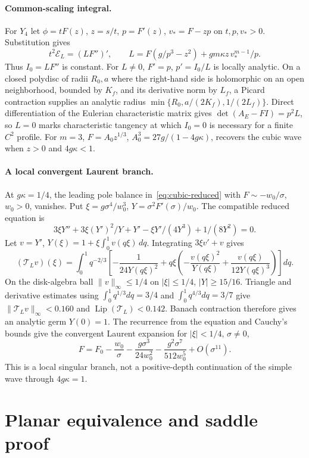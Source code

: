 \documentclass[12pt,a4paper,oneside]{report}
\numberwithin{equation}{chapter}
\theoremstyle{definition}
\theoremstyle{remark}\newtheorem{remark}[theorem]{Remark}
\newif\ifreviewmarks
\DeclareRobustCommand{\review}[1]{{\ifreviewmarks\color{authorblue}\fi #1}}
\begin{document}
\paragraph{Common-scaling integral.}
For $Y_4$ let $\phi=tF(z)$, $z=s/t$, $p=F'(z)$, $v_*=F-zp$ on $t,p,v_*>0$. Substitution gives
\[
 t^2\mathcal E_L=(LF'')',\qquad
 L=F(g/p^3-z^2)+gm\kappa z\,v_*^{m-1}/p .
\]
Thus $I_0=LF''$ is constant. For $L\ne0$, $F'=p$, $p'=I_0/L$ is locally analytic. On a closed polydisc of radii $R_0,a$ where the right-hand side is holomorphic on an open neighborhood, bounded by $K_f$, and its derivative norm by $L_f$, a Picard contraction supplies an analytic radius $\min\{R_0,a/(2K_f),1/(2L_f)\}$. Direct differentiation of the Eulerian characteristic matrix gives $\det(A_E-FI)=p^2L$, so $L=0$ marks characteristic tangency at which $I_0=0$ is necessary for a finite $C^2$ profile. For $m=3$, $F=A_0z^{1/3}$, $A_0^3=27g/(1-4g\kappa)$, recovers the cubic wave when $z>0$ and $4g\kappa<1$.

\paragraph{A local convergent Laurent branch.}
At $g\kappa=1/4$, the leading pole balance in~\eqref{eq:cubic-reduced} with $F\sim-w_0/\sigma$, $w_0>0$, vanishes. Put $\xi=g\sigma^4/w_0^3$, $Y=\sigma^2F'(\sigma)/w_0$. The compatible reduced equation is
\[
 3\xi Y''+3\xi (Y')^2/Y+Y'-\xi Y'/(4Y^3)+1/(8Y^2)=0 .
\]
Let $v=Y'$, $Y(\xi)=1+\xi\int_0^1v(q\xi)\,dq$. Integrating $3\xi v'+v$ gives
\[
 (\mathcal T_L v)(\xi)=\int_0^1q^{-2/3}
 \left[-\frac1{24Y(q\xi)^2}
   +q\xi\left(-\frac{v(q\xi)^2}{Y(q\xi)}
             +\frac{v(q\xi)}{12Y(q\xi)^3}\right)\right]dq .
\]
On the disk-algebra ball $\|v\|_\infty\le1/4$ on $|\xi|\le1/4$, $|Y|\ge15/16$. Triangle and derivative estimates using $\int_0^1q^{1/3}dq=3/4$ and $\int_0^1q^{4/3}dq=3/7$ give $\|\mathcal T_Lv\|_\infty<0.160$ and $\operatorname{Lip}(\mathcal T_L)<0.142$. Banach contraction therefore gives an analytic germ $Y(0)=1$. The recurrence from the equation and Cauchy's bounds give the convergent Laurent expansion for $|\xi|<1/4$, $\sigma\ne0$,
\[
 F=F_0-\frac{w_0}{\sigma}
   -\frac{g\sigma^3}{24w_0^2}
   -\frac{g^2\sigma^7}{512w_0^5}+O(\sigma^{11}).
\]
\review{This is a local singular branch, not a positive-depth continuation of the simple wave through $4g\kappa=1$.}
\section{Planar equivalence and saddle proof}\label{app:potential-proof}\label{app:saddle-proof}
\end{document}

